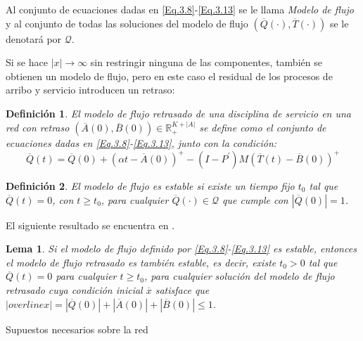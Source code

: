 \documentclass{article}
\newtheorem{Def}{Definición}[section]
\newtheorem{Lemma}{Lema}[section]
\newcommand{\rea}{\mathbb{R}}
\numberwithin{equation}{section}
\begin{document}
Al conjunto de ecuaciones dadas en \ref{Eq.3.8}-\ref{Eq.3.13} se
le llama {\em Modelo de flujo} y al conjunto de todas las
soluciones del modelo de flujo
$\left(\overline{Q}\left(\cdot\right),\overline{T}
\left(\cdot\right)\right)$ se le denotar\'a por $\mathcal{Q}$.

Si se hace $|x|\rightarrow\infty$ sin restringir ninguna de las
componentes, tambi\'en se obtienen un modelo de flujo, pero en
este caso el residual de los procesos de arribo y servicio
introducen un retraso:

\begin{Def}
El modelo de flujo retrasado de una disciplina de servicio en una
red con retraso
$\left(\overline{A}\left(0\right),\overline{B}\left(0\right)\right)\in\rea_{+}^{K+|A|}$
se define como el conjunto de ecuaciones dadas en
\ref{Eq.3.8}-\ref{Eq.3.13}, junto con la condici\'on:
\begin{equation}\label{CondAd.FluidModel}
\overline{Q}\left(t\right)=\overline{Q}\left(0\right)+\left(\alpha
t-\overline{A}\left(0\right)\right)^{+}-\left(I-P^{'}\right)M\left(\overline{T}\left(t\right)-\overline{B}\left(0\right)\right)^{+}
\end{equation}
\end{Def}

\begin{Def}
El modelo de flujo es estable si existe un tiempo fijo $t_{0}$ tal
que $\overline{Q}\left(t\right)=0$, con $t\geq t_{0}$, para
cualquier $\overline{Q}\left(\cdot\right)\in\mathcal{Q}$ que
cumple con $|\overline{Q}\left(0\right)|=1$.
\end{Def}

El siguiente resultado se encuentra en \cite{Chen}.
\begin{Lemma}
Si el modelo de flujo definido por \ref{Eq.3.8}-\ref{Eq.3.13} es
estable, entonces el modelo de flujo retrasado es tambi\'en
estable, es decir, existe $t_{0}>0$ tal que
$\overline{Q}\left(t\right)=0$ para cualquier $t\geq t_{0}$, para
cualquier soluci\'on del modelo de flujo retrasado cuya
condici\'on inicial $\overline{x}$ satisface que
$|overline{x}|=|\overline{Q}\left(0\right)|+|\overline{A}\left(0\right)|+|\overline{B}\left(0\right)|\leq1$.
\end{Lemma}

Supuestos necesarios sobre la red
\end{document}
